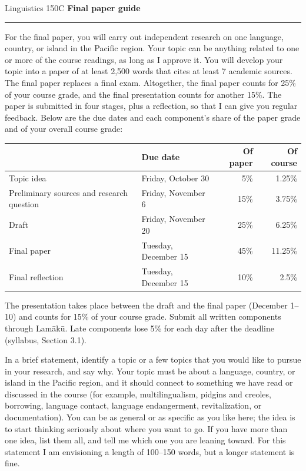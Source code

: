 \documentclass[11pt]{article}
\newcommand{\sect}[1]{\vspace{0.9em}{\large\textbf{#1}}\par\vspace{-0.2em}}
\begin{document}
\noindent Linguistics 150C \hfill \textbf{Final paper guide}\\[-0.6em]
\noindent\rule{\linewidth}{0.4pt}

For the final paper, you will carry out independent research on one language, country, or island in the Pacific region. Your topic can be anything related to one or more of the course readings, as long as I approve it. You will develop your topic into a paper of at least 2,500 words that cites at least 7 academic sources. The final paper replaces a final exam. Altogether, the final paper counts for 25\% of your course grade, and the final presentation counts for another 15\%. The paper is submitted in four stages, plus a reflection, so that I can give you regular feedback. Below are the due dates and each component's share of the paper grade and of your overall course grade:

\begin{center}
\begin{tabular}{@{}llrr@{}}
\toprule
 & \textbf{Due date} & \textbf{Of paper} & \textbf{Of course}\\
\midrule
Topic idea & Friday, October 30 & 5\% & 1.25\%\\
Preliminary sources and research question & Friday, November 6 & 15\% & 3.75\%\\
Draft & Friday, November 20 & 25\% & 6.25\%\\
Final paper & Tuesday, December 15 & 45\% & 11.25\%\\
Final reflection & Tuesday, December 15 & 10\% & 2.5\%\\
\bottomrule
\end{tabular}
\end{center}

The presentation takes place between the draft and the final paper (December 1--10) and counts for 15\% of your course grade. Submit all written components through Lamākū. Late components lose 5\% for each day after the deadline (syllabus, Section 3.1).

\sect{Topic idea}
In a brief statement, identify a topic or a few topics that you would like to pursue in your research, and say why. Your topic must be about a language, country, or island in the Pacific region, and it should connect to something we have read or discussed in the course (for example, multilingualism, pidgins and creoles, borrowing, language contact, language endangerment, revitalization, or documentation). You can be as general or as specific as you like here; the idea is to start thinking seriously about where you want to go. If you have more than one idea, list them all, and tell me which one you are leaning toward. For this statement I am envisioning a length of 100--150 words, but a longer statement is fine.
\end{document}
